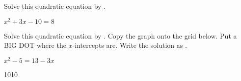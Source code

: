 \documentclass[12pt,letterpaper]{memoir}
\begin{document}
\pagestyle{empty}
\checkandfixthelayout
\raggedbottom

\forONLEVEL
{}

\vspace{-2\onelineskip}
{
    Solve this quadratic equation 
    by .
    \begin{center}
        $x^2 + 3x - 10 = 8$
    \end{center}
    \tcblower
    \vspace{2in}
}

\myWideProblemWithContent
{
    Solve this quadratic equation 
    by . 
    Copy the graph onto the grid below.
    Put a BIG DOT where the $x$-intercepts are.
    Write the solution as .
    \begin{center}
        $ x^2 - 5 = 13 - 3x $
    \end{center}
    \tcblower
    \begin{center}
        \begin{myTikzpictureGrid}{0.2} {10}{10}
        \end{myTikzpictureGrid}
    \end{center}
}

\end{document}
